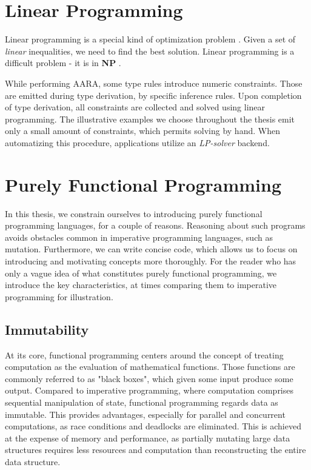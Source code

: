 \section{Linear Programming}\label{sec:linear-programming}

Linear programming \cite{LinearProgramming2023} is a special kind of optimization problem \cite{OptimizationProblem2022}. Given a set of \emph{linear} inequalities, we need to find the best solution. Linear programming is a difficult problem - it is in \textbf{NP} \cite[page~56]{aroraComputationalComplexityModern2009}. 

While performing AARA, some type rules introduce numeric constraints. Those are emitted during type derivation, by specific inference rules. Upon completion of type derivation, all constraints are collected and solved using linear programming. The illustrative examples we choose throughout the thesis emit only a small amount of constraints, which permits solving by hand. When automatizing this procedure, applications utilize an \emph{LP-solver} backend.

\section{Purely Functional Programming}\label{sec:functional-programming}

In this thesis, we constrain ourselves to introducing purely functional programming languages, for a couple of reasons. Reasoning about such programs avoids obstacles common in imperative programming languages, such as mutation. Furthermore, we can write concise code, which allows us to focus on introducing and motivating concepts more thoroughly. For the reader who has only a vague idea of what constitutes purely functional programming, we introduce the key characteristics, at times comparing them to imperative programming for illustration.

\subsection{Immutability}

At its core, functional programming centers around the concept of treating computation as the evaluation of mathematical functions. Those functions are commonly referred to as "black boxes", which given some input produce some output. Compared to imperative programming, where computation comprises sequential manipulation of state, functional programming regards data as immutable. This provides advantages, especially for parallel and concurrent computations, as race conditions and deadlocks are eliminated. This is achieved at the expense of memory and performance, as partially mutating large data structures requires less resources and computation than reconstructing the entire data structure.

